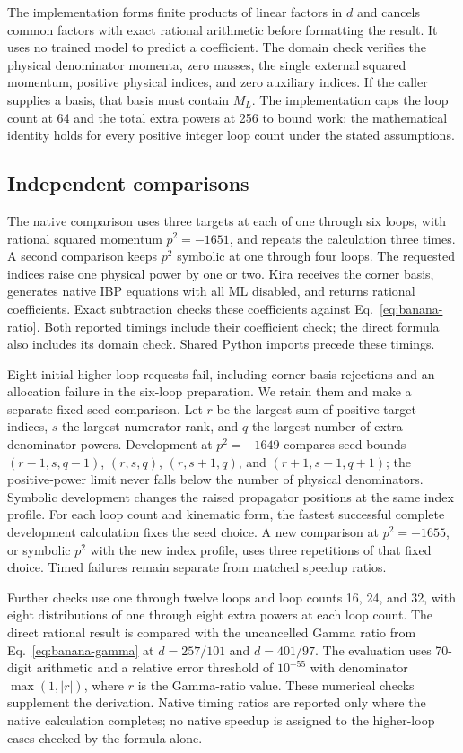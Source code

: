The implementation forms finite products of linear factors in $d$ and
cancels common factors with exact rational arithmetic before formatting
the result. It uses no trained model to predict a coefficient. The domain
check verifies the physical denominator momenta, zero masses, the single
external squared momentum, positive physical indices, and zero auxiliary
indices. If the caller supplies a basis, that basis must contain $M_L$.
The implementation caps the loop count at 64 and the total extra powers
at 256 to bound work; the mathematical identity holds for every positive
integer loop count under the stated assumptions.

\subsection{Independent comparisons}
The native comparison uses three targets at each of one through six loops,
with rational squared momentum $p^2=-1651$, and repeats the calculation
three times. A second comparison keeps $p^2$ symbolic at one through four
loops. The requested indices raise one physical power by one or two.
Kira receives the corner basis, generates native IBP equations with all ML
disabled, and returns rational coefficients. Exact subtraction checks these
coefficients against Eq.~\eqref{eq:banana-ratio}. Both reported timings include
their coefficient check; the direct formula also includes its domain check.
Shared Python imports precede these timings.

Eight initial higher-loop requests fail, including corner-basis rejections
and an allocation failure in the six-loop preparation. We retain them and
make a separate fixed-seed comparison. Let $r$ be the
largest sum of positive target indices, $s$ the largest numerator rank,
and $q$ the largest number of extra denominator powers. Development at
$p^2=-1649$ compares seed bounds $(r-1,s,q-1)$, $(r,s,q)$,
$(r,s+1,q)$, and $(r+1,s+1,q+1)$; the positive-power limit never falls
below the number of physical denominators. Symbolic development changes
the raised propagator positions at the same index profile. For each loop
count and kinematic form, the fastest successful complete development
calculation fixes the seed choice. A new comparison at $p^2=-1655$, or
symbolic $p^2$ with the new index profile, uses three repetitions of that
fixed choice. Timed failures remain separate from matched speedup ratios.

Further checks use one through twelve loops and loop counts 16, 24, and 32,
with eight distributions of one through eight extra powers at each loop
count. The direct rational result is compared with the uncancelled Gamma
ratio from Eq.~\eqref{eq:banana-gamma} at $d=257/101$ and $d=401/97$.
The evaluation uses 70-digit arithmetic and a relative error threshold of
$10^{-55}$ with denominator $\max(1,|r|)$, where $r$ is the Gamma-ratio
value. These numerical checks supplement the derivation. Native timing
ratios are reported only where the native calculation completes; no native
speedup is assigned to the higher-loop cases checked by the formula alone.

